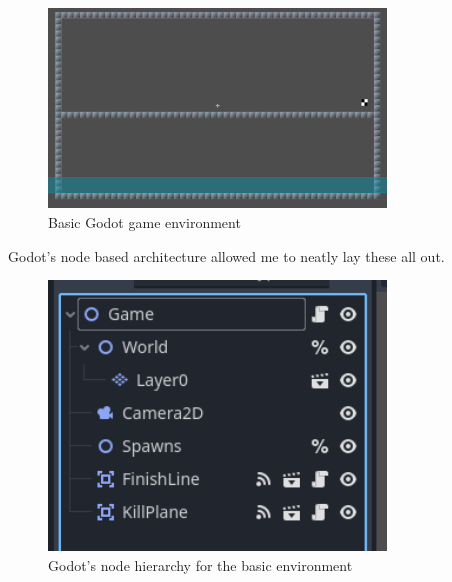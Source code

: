 \begin{figure}[h]
    \centering
    \includegraphics[width=0.8\textwidth]{figures/godot_environment_basic}
    \caption{Basic Godot game environment}
    \label{fig:godot_environment_basic}
\end{figure}

Godot's node based architecture allowed me to neatly lay these all out.

\begin{figure}[h]
    \centering
    \includegraphics[width=0.8\textwidth]{figures/godot_nodes_basic.png}
    \caption{Godot's node hierarchy for the basic environment}
    \label{fig:godot_nodes_basic}
\end{figure}